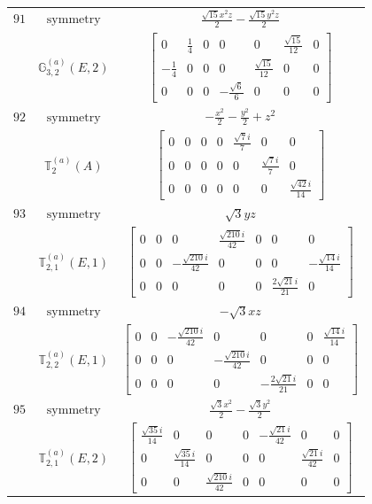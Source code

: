 \documentclass[fleqn,8pt,landscape]{jsarticle}
\begin{document}
\begin{longtable}{ccc}
$ 91 $ & $ \text{symmetry} $ & $ \frac{\sqrt{15} x^{2} z}{2} - \frac{\sqrt{15} y^{2} z}{2} $ \\
$  $ & $ \mathbb{G}_{3,2}^{(a)}(E,2) $ & $ \begin{bmatrix} 0 & \frac{1}{4} & 0 & 0 & 0 & \frac{\sqrt{15}}{12} & 0 \\ - \frac{1}{4} & 0 & 0 & 0 & \frac{\sqrt{15}}{12} & 0 & 0 \\ 0 & 0 & 0 & - \frac{\sqrt{6}}{6} & 0 & 0 & 0 \end{bmatrix} $ \\ \hline
$ 92 $ & $ \text{symmetry} $ & $ - \frac{x^{2}}{2} - \frac{y^{2}}{2} + z^{2} $ \\
$  $ & $ \mathbb{T}_{2}^{(a)}(A) $ & $ \begin{bmatrix} 0 & 0 & 0 & 0 & \frac{\sqrt{7} i}{7} & 0 & 0 \\ 0 & 0 & 0 & 0 & 0 & \frac{\sqrt{7} i}{7} & 0 \\ 0 & 0 & 0 & 0 & 0 & 0 & \frac{\sqrt{42} i}{14} \end{bmatrix} $ \\ \hline
$ 93 $ & $ \text{symmetry} $ & $ \sqrt{3} y z $ \\
$  $ & $ \mathbb{T}_{2,1}^{(a)}(E,1) $ & $ \begin{bmatrix} 0 & 0 & 0 & \frac{\sqrt{210} i}{42} & 0 & 0 & 0 \\ 0 & 0 & - \frac{\sqrt{210} i}{42} & 0 & 0 & 0 & - \frac{\sqrt{14} i}{14} \\ 0 & 0 & 0 & 0 & 0 & \frac{2 \sqrt{21} i}{21} & 0 \end{bmatrix} $ \\ \hline
$ 94 $ & $ \text{symmetry} $ & $ - \sqrt{3} x z $ \\
$  $ & $ \mathbb{T}_{2,2}^{(a)}(E,1) $ & $ \begin{bmatrix} 0 & 0 & - \frac{\sqrt{210} i}{42} & 0 & 0 & 0 & \frac{\sqrt{14} i}{14} \\ 0 & 0 & 0 & - \frac{\sqrt{210} i}{42} & 0 & 0 & 0 \\ 0 & 0 & 0 & 0 & - \frac{2 \sqrt{21} i}{21} & 0 & 0 \end{bmatrix} $ \\ \hline
$ 95 $ & $ \text{symmetry} $ & $ \frac{\sqrt{3} x^{2}}{2} - \frac{\sqrt{3} y^{2}}{2} $ \\
$  $ & $ \mathbb{T}_{2,1}^{(a)}(E,2) $ & $ \begin{bmatrix} \frac{\sqrt{35} i}{14} & 0 & 0 & 0 & - \frac{\sqrt{21} i}{42} & 0 & 0 \\ 0 & \frac{\sqrt{35} i}{14} & 0 & 0 & 0 & \frac{\sqrt{21} i}{42} & 0 \\ 0 & 0 & \frac{\sqrt{210} i}{42} & 0 & 0 & 0 & 0 \end{bmatrix} $ \\ \hline

\end{longtable}
\end{document}
